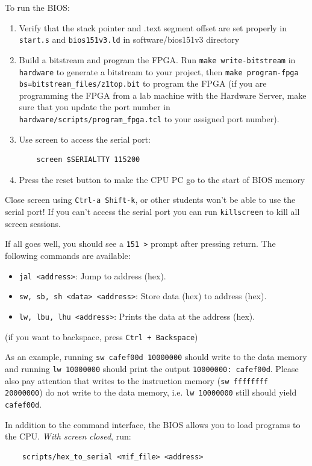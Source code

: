 \documentclass[11pt]{article}
\begin{document}
To run the BIOS:
\begin{enumerate}
  \item Verify that the stack pointer and .text segment offset are set properly in \verb|start.s| and \verb|bios151v3.ld| in software/bios151v3 directory
  \item Build a bitstream and program the FPGA. Run \verb|make write-bitstream| in \verb|hardware| to generate a bitstream to your project, then \verb|make program-fpga bs=bitstream_files/z1top.bit| to program the FPGA (if you are programming the FPGA from a lab machine with the Hardware Server, make sure that you update the port number in \verb|hardware/scripts/program_fpga.tcl| to your assigned port number).
  \item Use screen to access the serial port:
    \begin{verbatim}
    screen $SERIALTTY 115200
    \end{verbatim}
  \item Press the reset button to make the CPU PC go to the start of BIOS memory
\end{enumerate}

Close screen using \verb|Ctrl-a Shift-k|, or other students won't be able to use the serial port!
If you can't access the serial port you can run \verb|killscreen| to kill all screen sessions.

If all goes well, you should see a \verb|151 >| prompt after pressing return. The following commands are available:
\begin{itemize}
    \item \verb|jal <address>|: Jump to address (hex).
    \item \verb|sw, sb, sh <data> <address>|: Store data (hex) to address (hex).
    \item \verb|lw, lbu, lhu <address>|: Prints the data at the address (hex).
\end{itemize}

(if you want to backspace, press \verb|Ctrl + Backspace|)

As an example, running \verb|sw cafef00d 10000000| should write to the data memory and running \verb|lw 10000000| should print the output \verb|10000000: cafef00d|.
Please also pay attention that writes to the instruction memory (\verb|sw ffffffff 20000000|) do not write to the data memory, i.e. \verb|lw 10000000| still should yield \verb|cafef00d|.

In addition to the command interface, the BIOS allows you to load programs to the CPU. \textit{With screen closed}, run:
\begin{verbatim}
    scripts/hex_to_serial <mif_file> <address>
\end{verbatim}
\end{document}
